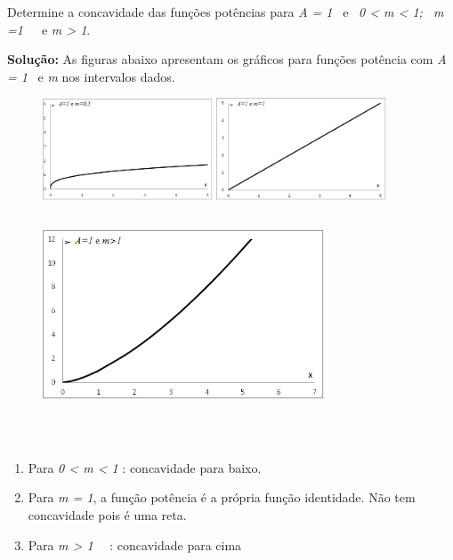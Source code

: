 \begin{texemplo}
	
Determine a concavidade das funções potências para \textit{A = 1}~ e~ \textit{0 < m < 1;~ m =1}~~~e  \textit{m > 1}. 

\textbf{Solução:} As figuras abaixo apresentam os gráficos para funções potência com \textit{A = 1}~ e  \textit{m} nos intervalos dados. 

\begin{figure}[H]	
	\includegraphics[width=0.45\textwidth]{capitulos/outras_funcoes/media/image5.png} \includegraphics[width=0.45\textwidth]{capitulos/outras_funcoes/media/image6.png}
\end{figure}

\begin{figure}[H]
	\begin{Center}
		\includegraphics[width=3.3in,height=2.29in]{capitulos/outras_funcoes/media/image7.png}
	\end{Center}
\end{figure}

~~

\begin{enumerate}
	\item Para  \textit{0 < m < 1} : concavidade para baixo.

	\item Para \textit{m = 1}, a função potência é a própria função identidade. Não tem concavidade pois é uma reta.

	\item Para \textit{m > 1}~~ : concavidade para cima \qedsymbol{}  
\end{enumerate}
\end{texemplo}

